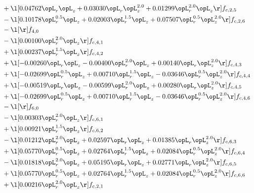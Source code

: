 \begin{alignat}{2}
& + \l[  0.04762 \opL_r \opL_z +  0.03030 \opL_r \opL_z^{2.0} +  0.01299 \opL_r^{2.0} \opL_z  \r] f_{c,2,5} \nonumber \\ 
& - \l[  0.10178 \opL_r^{0.5} \opL_z +  0.02003 \opL_r^{1.5} \opL_z +  0.07507 \opL_r^{0.5} \opL_z^{2.0}  \r] f_{c,2,6} \nonumber \\ 
& - \l[  \r] f_{4,0} \nonumber \\ 
& - \l[  0.00100 \opL_r^{2.0} \opL_z  \r] f_{c,4,1} \nonumber \\ 
& + \l[  0.00237 \opL_r^{1.5} \opL_z  \r] f_{c,4,2} \nonumber \\ 
& + \l[  -0.00260 \opL_r \opL_z   -0.00400 \opL_r^{2.0} \opL_z +  0.00140 \opL_r \opL_z^{2.0}  \r] f_{c,4,3} \nonumber \\ 
& + \l[  -0.02699 \opL_r^{0.5} \opL_z +  0.00710 \opL_r^{1.5} \opL_z   -0.03646 \opL_r^{0.5} \opL_z^{2.0}  \r] f_{c,4,4} \nonumber \\ 
& + \l[  -0.00519 \opL_r \opL_z   -0.00599 \opL_r^{2.0} \opL_z +  0.00280 \opL_r \opL_z^{2.0}  \r] f_{c,4,5} \nonumber \\ 
& + \l[  -0.02699 \opL_r^{0.5} \opL_z +  0.00710 \opL_r^{1.5} \opL_z   -0.03646 \opL_r^{0.5} \opL_z^{2.0}  \r] f_{c,4,6} \nonumber \\ 
& - \l[  \r] f_{6,0} \nonumber \\ 
& - \l[  0.00303 \opL_r^{2.0} \opL_z  \r] f_{c,6,1} \nonumber \\ 
& + \l[  0.00921 \opL_r^{1.5} \opL_z  \r] f_{c,6,2} \nonumber \\ 
& - \l[  0.01212 \opL_r^{2.0} \opL_z +  0.02597 \opL_r \opL_z +  0.01385 \opL_r \opL_z^{2.0}  \r] f_{c,6,3} \nonumber \\ 
& + \l[  0.05770 \opL_r^{0.5} \opL_z +  0.02764 \opL_r^{1.5} \opL_z +  0.02084 \opL_r^{0.5} \opL_z^{2.0}  \r] f_{c,6,4} \nonumber \\ 
& - \l[  0.01818 \opL_r^{2.0} \opL_z +  0.05195 \opL_r \opL_z +  0.02771 \opL_r \opL_z^{2.0}  \r] f_{c,6,5} \nonumber \\ 
& + \l[  0.05770 \opL_r^{0.5} \opL_z +  0.02764 \opL_r^{1.5} \opL_z +  0.02084 \opL_r^{0.5} \opL_z^{2.0}  \r] f_{c,6,6} \nonumber \\ 
& + \l[  0.00216 \opL_r^{2.0} \opL_z  \r] f_{c,2,1} \nonumber \\ 
\end{alignat} 


